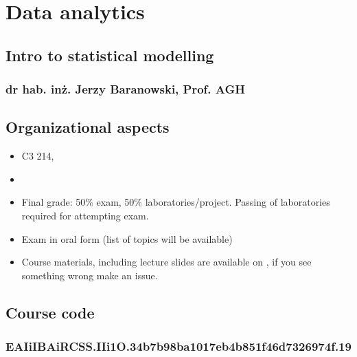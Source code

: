 \documentclass[letterpaper,10pt,english]{jupyterBook}
\begin{document}
\section{Data analytics}
\label{\detokenize{Lecture 1:data-analytics}}\label{\detokenize{Lecture 1::doc}}

\subsection{Intro to statistical modelling}
\label{\detokenize{Lecture 1:intro-to-statistical-modelling}}

\subsubsection{dr hab. inż. Jerzy Baranowski, Prof. AGH}
\label{\detokenize{Lecture 1:dr-hab-inz-jerzy-baranowski-prof-agh}}

\subsection{Organizational aspects}
\label{\detokenize{Lecture 1:organizational-aspects}}\begin{itemize}
\item {} 
\sphinxAtStartPar
C3 214,

\item {} 
\sphinxAtStartPar
{}

\item {} 
\sphinxAtStartPar
Final grade: 50\% exam, 50\% laboratories/project. Passing of laboratories required for attempting exam.

\item {} 
\sphinxAtStartPar
Exam in oral form (list of topics will be available)

\item {} 
\sphinxAtStartPar
Course materials, including lecture slides are available on , if you see something wrong \sphinxhyphen{} make an issue.

\end{itemize}


\subsection{Course code}
\label{\detokenize{Lecture 1:course-code}}

\subsubsection{EAIiIBAiRCSS.IIi1O.34b7b98ba1017eb4b851f46d7326974f.19}
\label{\detokenize{Lecture 1:eaiiibaircss-iii1o-34b7b98ba1017eb4b851f46d7326974f-19}}
\end{document}
